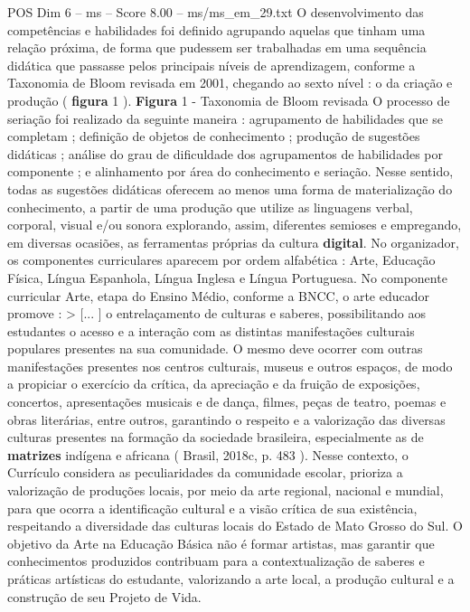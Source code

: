 \begin{textsample}{POS Dim 6 – ms – Score 8.00 – ms/ms\_em\_29.txt}
O desenvolvimento das competências e habilidades foi definido agrupando aquelas que tinham uma relação próxima, de forma que pudessem ser trabalhadas em uma sequência didática que passasse pelos principais níveis de aprendizagem, conforme a Taxonomia de Bloom revisada em 2001, chegando ao sexto nível : o da criação e produção ( \textbf{figura} 1 ). \textbf{Figura} 1 - Taxonomia de Bloom revisada O processo de seriação foi realizado da seguinte maneira : agrupamento de habilidades que se completam ; definição de objetos de conhecimento ; produção de sugestões didáticas ; análise do grau de dificuldade dos agrupamentos de habilidades por componente ; e alinhamento por área do conhecimento e seriação.
Nesse sentido, todas as sugestões didáticas oferecem ao menos uma forma de materialização do conhecimento, a partir de uma produção que utilize as linguagens verbal, corporal, visual e/ou sonora explorando, assim, diferentes semioses e empregando, em diversas ocasiões, as ferramentas próprias da cultura \textbf{digital}.
No organizador, os componentes curriculares aparecem por ordem alfabética : Arte, Educação Física, Língua Espanhola, Língua Inglesa e Língua Portuguesa.
No componente curricular Arte, etapa do Ensino Médio, conforme a BNCC, o arte educador promove : > [... ] o entrelaçamento de culturas e saberes, possibilitando aos estudantes o acesso e a interação com as distintas manifestações culturais populares presentes na sua comunidade.
O mesmo deve ocorrer com outras manifestações presentes nos centros culturais, museus e outros espaços, de modo a propiciar o exercício da crítica, da apreciação e da fruição de exposições, concertos, apresentações musicais e de dança, filmes, peças de teatro, poemas e obras literárias, entre outros, garantindo o respeito e a valorização das diversas culturas presentes na formação da sociedade brasileira, especialmente as de \textbf{matrizes} indígena e africana ( Brasil, 2018c, p. 483 ).
Nesse contexto, o Currículo considera as peculiaridades da comunidade escolar, prioriza a valorização de produções locais, por meio da arte regional, nacional e mundial, para que ocorra a identificação cultural e a visão crítica de sua existência, respeitando a diversidade das culturas locais do Estado de Mato Grosso do Sul.
O objetivo da Arte na Educação Básica não é formar artistas, mas garantir que conhecimentos produzidos contribuam para a contextualização de saberes e práticas artísticas do estudante, valorizando a arte local, a produção cultural e a construção de seu Projeto de Vida.

\end{textsample}
